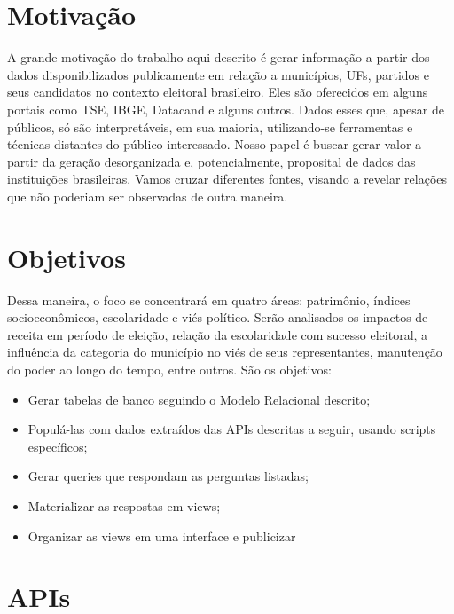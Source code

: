 \section*{Motivação}\label{sec:motivacao}


A grande motivação do trabalho aqui descrito é gerar informação a partir dos dados disponibilizados publicamente
em relação a municípios, UFs, partidos e seus candidatos no contexto eleitoral brasileiro. Eles
são oferecidos em alguns portais como TSE, IBGE, Datacand e alguns outros. Dados esses que, apesar de públicos, 
só são interpretáveis, em sua maioria, utilizando-se ferramentas e técnicas distantes do público interessado. Nosso papel é buscar
gerar valor a partir da geração desorganizada e, potencialmente, proposital de dados das instituições brasileiras. Vamos cruzar 
diferentes fontes, visando a revelar relações que não poderiam ser observadas de outra maneira. 

\section*{Objetivos}\label{sec:objetivos}

Dessa maneira, o foco se concentrará em quatro áreas: patrimônio, índices socioeconômicos, escolaridade e viés político. 
Serão analisados
os impactos de receita em período de eleição, relação da escolaridade com sucesso eleitoral, a influência da categoria do município
no viés de seus representantes, manutenção do poder ao longo do tempo, entre outros. São os objetivos:

\begin{itemize}

    \item Gerar tabelas de banco seguindo o Modelo Relacional descrito;
    \item Populá-las com dados extraídos das APIs descritas a seguir, usando scripts específicos;
    \item Gerar queries que respondam as perguntas listadas;
    \item Materializar as respostas em views;
    \item Organizar as views em uma interface e publicizar
\end{itemize}

\section*{APIs}\label{sec:apis}

